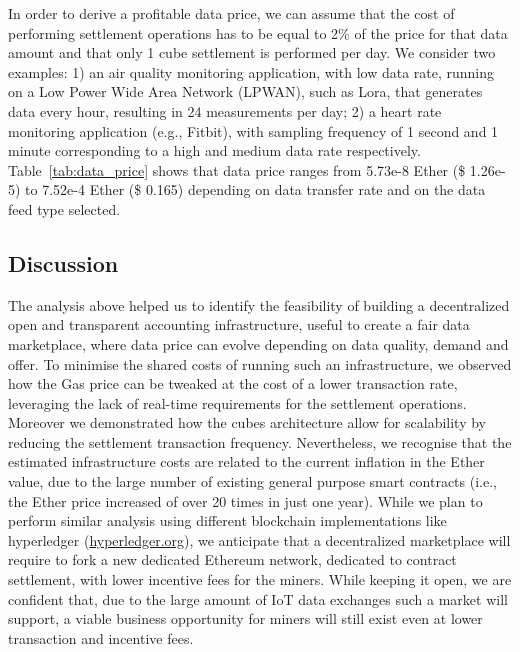 In order to derive a profitable data price, we can assume that the cost of performing settlement operations has to be equal to 2\% of the price for that data amount and that only 1 cube settlement is performed per day. We consider two examples: 1) an air quality monitoring application, with low data rate, running on a Low Power Wide Area Network (LPWAN), such as Lora, that generates data every hour, resulting in 24 measurements per day; 2) a heart rate monitoring application (e.g., Fitbit), with sampling frequency of 1 second and 1 minute corresponding to a high and medium data rate respectively.  
Table~\ref{tab:data_price} shows that data price ranges from 5.73e-8 Ether (\$ 1.26e-5) to 7.52e-4 Ether (\$ 0.165) depending on data transfer rate and on the data feed type selected. 

\subsection{Discussion}
\label{sec:discussion}
The analysis above helped us to identify the feasibility of building a decentralized open and transparent accounting infrastructure, useful to create a fair data marketplace, where data price can evolve depending on data quality, demand and offer. To minimise the shared costs of running such an infrastructure, we observed how the Gas price can be tweaked at the cost of a lower transaction rate, leveraging the lack of real-time requirements for the settlement operations. Moreover we demonstrated how the cubes architecture allow for scalability by reducing the settlement transaction frequency.
Nevertheless, we recognise that the estimated infrastructure costs are related to the current inflation in the Ether value, due to the large number of existing general purpose smart contracts (i.e., the Ether price increased of over 20 times in just one year). While we plan to perform similar analysis using different blockchain implementations like hyperledger (\url{hyperledger.org}), we anticipate that a decentralized marketplace will require to fork a new dedicated Ethereum network, dedicated to contract settlement, with lower incentive fees for the miners. While keeping it open, we are confident that, due to the large amount of IoT data exchanges such a market will support, a viable business opportunity for miners will still exist even at lower transaction and incentive fees.

